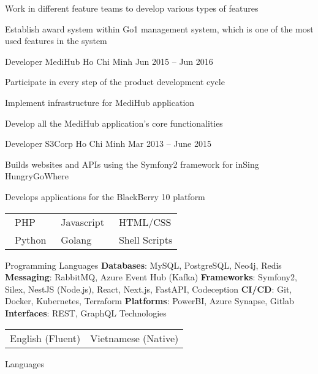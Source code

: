 \documentclass[]{awesome-cv}
\begin{document}
\begin{cventries}
	{\begin{cvitems}
		\item {Work in different feature teams to develop various types of features}
		\item {Establish award system within Go1 management system, which is one of the most used features in the system}
		\end{cvitems}}
	\cventry
	{Developer}
	{MediHub}
	{Ho Chi Minh}
	{Jun 2015 – Jun 2016}
	{\begin{cvitems}
		\item {Participate in every step of the product development cycle}
		\item {Implement infrastructure for MediHub application}
		\item {Develop all the MediHub application's core functionalities}
		\end{cvitems}}
	\cventry
	{Developer}
	{S3Corp}
	{Ho Chi Minh}
	{Mar 2013 – June 2015}
	{
		\begin{cvitems}
			\item {Builds websites and APIs using the Symfony2 framework for inSing HungryGoWhere}
			\item {Develops applications for the BlackBerry 10 platform}
		\end{cvitems}
	}
\end{cventries}
\begin{cventries}
	\cventry
	{\def\arraystretch{1.15}{\begin{tabular}{p{3cm}@{\hspace{0.1cm}} @{\hspace{0.1cm}}p{3cm}@{\hspace{0.1cm}} @{\hspace{0.1cm}}p{3cm}@{\hspace{0.1cm}} }
		{\faStar \, PHP} & {\faStarHalfO \, Javascript} & {\faStarHalfO \, HTML/CSS} \\
		{\faStarHalfO \, Python} & {\faStarHalfO \, Golang} & {\faStarHalfO \, Shell Scripts} \\
		\end{tabular}}}
	{Programming Languages}
	{}
	{}
	{}
	\cventry
	{
		\textbf{Databases}: MySQL, PostgreSQL, Neo4j, Redis \break
		\textbf{Messaging}: RabbitMQ, Azure Event Hub (Kafka) \break
		\textbf{Frameworks}: Symfony2, Silex, NestJS (Node.js), React, Next.js, FastAPI, Codeception \break
		\textbf{CI/CD}: Git, Docker, Kubernetes, Terraform \break
		\textbf{Platforms}: PowerBI, Azure Synapse, Gitlab \break
		\textbf{Interfaces}: REST, GraphQL
	}
	{Technologies}
	{}
	{}
	{}
	\cventry
	{\def\arraystretch{1.15}{\begin{tabular}{p{3cm}@{\hspace{0.1cm}} @{\hspace{0.1cm}}p{3cm}@{\hspace{0.1cm}}}
		{English (Fluent)} & {Vietnamese (Native)} \\
		\end{tabular}}}
	{Languages}
	{}
	{}
	{}
\end{cventries}
\end{document}

